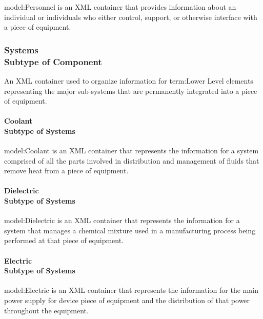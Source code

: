 \FloatBarrier

{model:Personnel} is an XML container that provides information about an individual or individuals who either control, support, or otherwise interface with a piece of equipment.


\FloatBarrier
\subsubsection[Systems]{Systems \\ {\small Subtype of Component}}
  \label{type:Systems}

\FloatBarrier

An XML container used to organize information for {term:Lower Level} elements representing the major sub-systems that are permanently integrated into a piece of equipment.

\paragraph[Coolant]{Coolant \\ {\small Subtype of Systems}}\mbox{}
  \label{type:Coolant}

\FloatBarrier

{model:Coolant} is an XML container that represents the information for a system comprised of all the parts involved in distribution and management of fluids that remove heat from a piece of equipment.

\paragraph[Dielectric]{Dielectric \\ {\small Subtype of Systems}}\mbox{}
  \label{type:Dielectric}

\FloatBarrier

{model:Dielectric} is an XML container that represents the information for a system that manages a chemical mixture used in a manufacturing process being performed at that piece of equipment.

\paragraph[Electric]{Electric \\ {\small Subtype of Systems}}\mbox{}
  \label{type:Electric}

\FloatBarrier

{model:Electric} is an XML container that represents the information for the main power supply for device piece of equipment and the distribution of that power throughout the equipment.


